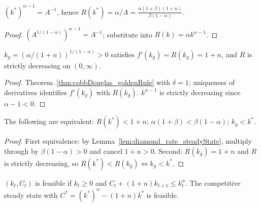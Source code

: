 \begin{lemma}
\label{lem:diamond_rate_steadyState}
\leanok
{}
$(k^*)^{\alpha - 1} = A^{-1}$, hence $R(k^*) = \alpha/A = \frac{\alpha(1+\beta)(1+n)}{\beta(1-\alpha)}$.
\end{lemma}
\begin{proof}
\leanok
$(A^{1/(1-\alpha)})^{\alpha-1} = A^{-1}$; substitute into $R(k) = \alpha k^{\alpha-1}$.
\end{proof}

\begin{lemma}
\label{lem:diamond_kgold}
\leanok
{}
$k_g = (\alpha/(1+n))^{1/(1-\alpha)} > 0$ satisfies $f'(k_g) = R(k_g) = 1 + n$, and $R$ is strictly decreasing
on $(0, \infty)$.
\end{lemma}
\begin{proof}
\leanok
Theorem~\ref{thm:cobbDouglas_goldenRule} with $\delta = 1$; uniqueness of derivatives identifies $f'(k_g)$
with $R(k_g)$. $k^{\alpha-1}$ is strictly decreasing since $\alpha - 1 < 0$.
\end{proof}

\begin{theorem}
\label{thm:diamond_dynamicallyInefficient_iff}
\leanok
{}
The following are equivalent: $R(k^*) < 1 + n$; $\alpha(1+\beta) < \beta(1-\alpha)$; $k_g < k^*$.
\end{theorem}
\begin{proof}
\leanok
First equivalence: by Lemma~\ref{lem:diamond_rate_steadyState}, multiply through by $\beta(1-\alpha) > 0$ and cancel
$1 + n > 0$. Second: $R(k_g) = 1 + n$ and $R$ is strictly decreasing, so $R(k^*) < R(k_g) \iff k_g < k^*$.
\end{proof}

\begin{definition}
\label{def:diamond_feasible}
\leanok
{}
$(k_t, C_t)$ is feasible if $k_t \ge 0$ and $C_t + (1+n)k_{t+1} \le k_t^\alpha$. The competitive steady state
with $C^* = (k^*)^\alpha - (1+n)k^*$ is feasible.
\end{definition}

